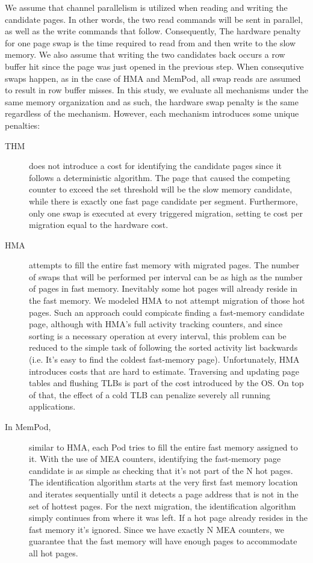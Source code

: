 We assume that channel parallelism is utilized when reading and writing the candidate pages. In other words, the two read commands will be sent in parallel, as well as the write commands that follow. Consequently, The hardware penalty for one page swap is the time required to read from and then write to the slow memory. We also assume that writing the two candidates back occurs a row buffer hit since the page was just opened in the previous step. When consequtive swaps happen, as in the case of HMA and MemPod, all swap reads are assumed to result in row buffer misses. In this study, we evaluate all mechanisms under the same memory organization and as such, the hardware swap penalty is the same regardless of the mechanism. However, each mechanism introduces some unique penalties:
\begin{description}
	\item[THM] does not introduce a cost for identifying the candidate pages since it follows a deterministic algorithm. The page that caused the competing counter to exceed the set threshold will be the slow memory candidate, while there is exactly one fast page candidate per segment. Furthermore, only one swap is executed at every triggered migration, setting te cost per migration equal to the hardware cost.
	\item[HMA ] attempts to fill the entire fast memory with migrated pages. The number of swaps that will be performed per interval can be as high as the number of pages in fast memory. Inevitably some hot pages will already reside in the fast memory. We modeled HMA to not attempt migration of those hot pages. Such an approach could compicate finding a fast-memory candidate page, although with HMA's full activity tracking counters, and since sorting is a necessary operation at every interval, this problem can be reduced to the simple task of following the sorted activity list backwards (i.e. It's easy to find the coldest fast-memory page). Unfortunately, HMA introduces costs that are hard to estimate. Traversing and updating page tables and flushing TLBs is part of the cost introduced by the OS. On top of that, the effect of a cold TLB can penalize severely all running applications.
	\item[In MemPod,] similar to HMA, each Pod tries to fill the entire fast memory assigned to it. With the use of MEA counters, identifying the fast-memory page candidate is as simple as checking that it's not part of the N hot pages. The identification algorithm starts at the very first fast memory location and iterates sequentially until it detects a page address that is not in the set of hottest pages. For the next migration, the identification algorithm simply continues from where it was left. If a hot page already resides in the fast memory it's ignored. Since we have exactly N MEA counters, we guarantee that the fast memory will have enough pages to accommodate all hot pages.
\end{description}

